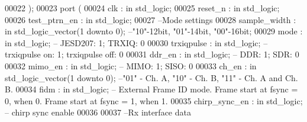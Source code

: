 \begin{DoxyCode}
00022       \textcolor{vhdlchar}{)};
00023    \textcolor{keywordflow}{port} \textcolor{vhdlchar}{(}
00024       \textcolor{vhdlchar}{clk}                  \textcolor{vhdlchar}{:} \textcolor{keywordflow}{in} \textcolor{comment}{std\_logic};
00025       \textcolor{vhdlchar}{reset_n}              \textcolor{vhdlchar}{:} \textcolor{keywordflow}{in} \textcolor{comment}{std\_logic};
00026       \textcolor{vhdlchar}{test_ptrn_en}         \textcolor{vhdlchar}{:} \textcolor{keywordflow}{in} \textcolor{comment}{std\_logic};
00027 \textcolor{keyword}{      --Mode settings}
00028       \textcolor{vhdlchar}{sample_width}         \textcolor{vhdlchar}{:} \textcolor{keywordflow}{in} \textcolor{comment}{std\_logic\_vector}\textcolor{vhdlchar}{(}\textcolor{vhdllogic}{}\textcolor{vhdllogic}{1} \textcolor{keywordflow}{downto} \textcolor{vhdllogic}{}\textcolor{vhdllogic}{0}\textcolor{vhdlchar}{)};\textcolor{keyword}{ --"10"-12bit, "01"-14bit, "00"-16bit;}
00029       \textcolor{vhdlchar}{mode}                 \textcolor{vhdlchar}{:} \textcolor{keywordflow}{in} \textcolor{comment}{std\_logic};\textcolor{keyword}{ -- JESD207: 1; TRXIQ: 0}
00030       \textcolor{vhdlchar}{trxiqpulse}           \textcolor{vhdlchar}{:} \textcolor{keywordflow}{in} \textcolor{comment}{std\_logic};\textcolor{keyword}{ -- trxiqpulse on: 1; trxiqpulse off: 0}
00031       \textcolor{vhdlchar}{ddr_en}               \textcolor{vhdlchar}{:} \textcolor{keywordflow}{in} \textcolor{comment}{std\_logic};\textcolor{keyword}{ -- DDR: 1; SDR: 0}
00032       \textcolor{vhdlchar}{mimo_en}              \textcolor{vhdlchar}{:} \textcolor{keywordflow}{in} \textcolor{comment}{std\_logic};\textcolor{keyword}{ -- MIMO: 1; SISO: 0}
00033       \textcolor{vhdlchar}{ch_en}                \textcolor{vhdlchar}{:} \textcolor{keywordflow}{in} \textcolor{comment}{std\_logic\_vector}\textcolor{vhdlchar}{(}\textcolor{vhdllogic}{}\textcolor{vhdllogic}{1} \textcolor{keywordflow}{downto} \textcolor{vhdllogic}{}\textcolor{vhdllogic}{0}\textcolor{vhdlchar}{)};\textcolor{keyword}{ --"01" - Ch. A, "10" - Ch. B, "11" - Ch. A
       and Ch. B. }
00034       \textcolor{vhdlchar}{fidm}                 \textcolor{vhdlchar}{:} \textcolor{keywordflow}{in} \textcolor{comment}{std\_logic};\textcolor{keyword}{ -- External Frame ID mode. Frame start at fsync = 0, when 0.
       Frame start at fsync = 1, when 1.}
00035         \textcolor{vhdlchar}{chirp_sync_en}           \textcolor{vhdlchar}{:} \textcolor{keywordflow}{in} \textcolor{comment}{std\_logic};\textcolor{keyword}{ -- chirp sync enable}
00036         
00037 \textcolor{keyword}{      --Rx interface data }

\end{DoxyCode}
